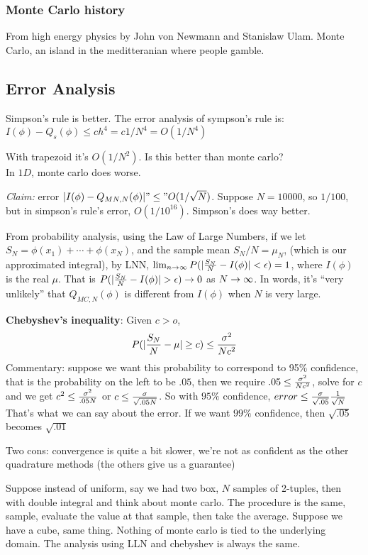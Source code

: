 \subsubsection{Monte Carlo history}
\label{sec:mchistory}

From high energy physics by  John von Newmann and Stanislaw
Ulam. Monte Carlo, an island in the meditteranian where people gamble.

\subsection{Error Analysis}
\label{sec:erroranalysis}
Simpson's rule is better. The error analysis of sympson's rule
is: $I(\phi) - Q_s(\phi) \le ch^4 = c1/N^4 = O(1/N^4)$

With trapezoid it's $O(1/N^2)$. Is this better than monte carlo? \\In
$1D$, monte carlo does worse.


\emph{Claim:} error $|I(\phi) - Q_{MN, N}(\phi)| "\le"
O(1/\sqrt{N})$. Suppose $N=10000$, so $1/100$, but in simpson's rule's
error, $O(1/10^{16})$. Simpson's does way better.

 From probability analysis, using the Law of Large Numbers, if we let
 $S_N = \phi(x_1) + \cdots + \phi(x_N)$, and the sample mean $S_N/N=\mu_N$,
 (which is our approximated integral), by LNN,
 $\lim_{n\rightarrow\infty}P(|\frac{S_N}{N} - I(\phi)| < \epsilon) = 1$, where
 $I(\phi)$ is the real $\mu$. That is $P(|\frac{S_N}{N} -
 I(\phi)| > \epsilon) \rightarrow 0$ as $N\rightarrow \infty$. In words, it's ``very
 unlikely'' that $Q_{MC,N}(\phi)$ is different from $I(\phi)$ when $N$
 is very large.

\textbf{Chebyshev's inequality}: Given $c>o$, $$P(|\frac{S_N}{N} -
\mu|\ge c) \le \frac{\sigma^2}{Nc^2}$$ Commentary: suppose we want this
probability to correspond to 95\% confidence, that is the probability on the left
to be $.05$, then  we require $.05 \le \frac{\sigma^2}{Nc^2}$, solve for
$c$ and we get $c^2\le \frac{\sigma^2}{.05N}$ or $c\le
\frac{\sigma}{\sqrt{.05N}}$. So with $95\%$ confidence, $error\le
\frac{\sigma}{\sqrt{.05}}\frac{1}{\sqrt{N}}$
That's what we can say about the error. If we want $99\%$ confidence,
then $\sqrt{.05}$ becomes $\sqrt{.01}$

Two cons: convergence is quite a bit slower, we're not as confident as
the other quadrature methods (the others give us a guarantee)

Suppose instead of uniform, say we had two box, $N$ samples of
2-tuples, then with double integral and think about monte carlo. The
procedure is the same, sample, evaluate the value at that sample, then
take the average. Suppose we have a cube, same thing. Nothing of monte carlo is
tied to the underlying domain. The analysis using LLN and chebyshev is
always the same.

